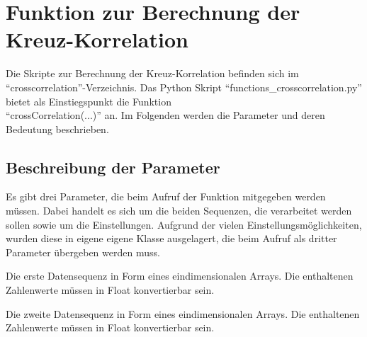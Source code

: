 \chapter{Funktion zur Berechnung der Kreuz-Korrelation}
\label{chp:crosscorrelation:implementation}
Die Skripte zur Berechnung der Kreuz-Korrelation befinden sich im \enquote{crosscorrelation}-Verzeichnis.
Das Python Skript \enquote{functions\_crosscorrelation.py} bietet als Einstiegspunkt die Funktion\\ \mbox{\enquote{crossCorrelation(...)}} an. Im Folgenden werden die Parameter und deren Bedeutung beschrieben.

\section{Beschreibung der Parameter}

Es gibt drei Parameter, die beim Aufruf der Funktion mitgegeben werden müssen. Dabei handelt es sich um die beiden Sequenzen, die verarbeitet werden sollen sowie um die Einstellungen. Aufgrund der vielen Einstellungsmöglichkeiten, wurden diese in eigene eigene Klasse ausgelagert, die beim Aufruf als dritter Parameter übergeben werden muss.
\begin{description}[style=nextline]
\item[seqA] Die erste Datensequenz in Form eines eindimensionalen Arrays. Die enthaltenen Zahlenwerte müssen in Float konvertierbar sein.
\item[seqB] Die zweite Datensequenz in Form eines eindimensionalen Arrays. Die enthaltenen Zahlenwerte müssen in Float konvertierbar sein.
\end{description}

